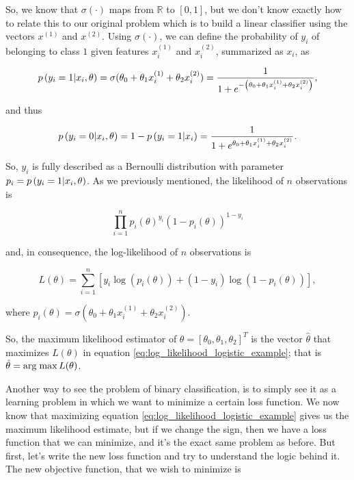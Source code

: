 So, we know that $\sigma \left( \cdot \right)$ maps from $\mathbb{R}$ to $\left[ 0,1 \right]$, but we don't know exactly how to relate this to our original problem which is to build a linear classifier using the vectors $x^{(1)}$ and $x^{(2)}$. Using  $\sigma \left( \cdot \right)$, we can define the probability of $y_i$ of belonging to class $1$ given features $x_i^{(1)}$ and $x_i^{(2)}$, summarized as $x_i$, as

$$
  p\left( y_i = 1 | x_i, \theta \right) = \sigma(\theta_0 + \theta_1 x_i^{(1)} + \theta_2 x_i^{(2)}) = \frac{1}{1 + e^{-\left( \theta_0 + \theta_1 x_i^{(1)} + \theta_2 x_i^{(2)} \right)}},
$$

and thus

$$
  p\left( y_i = 0 | x_i, \theta \right) = 1 - p\left( y_i = 1 | x_i \right) = \frac{1}{1 + e^{\theta_0 + \theta_1 x_i^{(1)} + \theta_2 x_i^{(2)}}}.
$$

So, $y_i$ is fully described as a Bernoulli distribution with parameter $p_i =p\left( y_i = 1 | x_i, \theta \right)$. As we previously mentioned, the likelihood of $n$ observations is

$$
  \prod_{i = 1}^n  p_i(\theta)^{y_i}\left(1 - p_i(\theta) \right)^{1 - y_i}
$$

and, in consequence, the log-likelihood of $n$ observations is

\begin{equation}
  \label{eq:log_likelihood_logistic_example}
  L(\theta) = \sum_{i = 1}^n \left[ y_i \log\left( p_i(\theta) \right) + (1 - y_i) \log \left( 1 - p_i(\theta) \right) \right],
\end{equation}

where $p_i(\theta) = \sigma(\theta_0 + \theta_1 x_i^{(1)} + \theta_2 x_i^{(2)})$.

So, the maximum likelihood estimator of $\theta = \left[ \theta_0, \theta_1, \theta_2 \right]^T$ is the vector $\hat{\theta}$ that maximizes $L(\theta)$ in equation \ref{eq:log_likelihood_logistic_example}; that is $\hat{\theta} = \operatorname*{arg\; max} L(\theta)$.

Another way to see the problem of binary classification, is to simply see it as a learning problem in which we want to minimize a certain loss function. We now know that maximizing equation \ref{eq:log_likelihood_logistic_example} gives us the maximum likelihood estimate, but if we change the sign, then we have a loss function that we can minimize, and it's the exact same problem as before. But first, let's write the new loss function and try to understand the logic behind it. The new objective function, that we wish to minimize is

